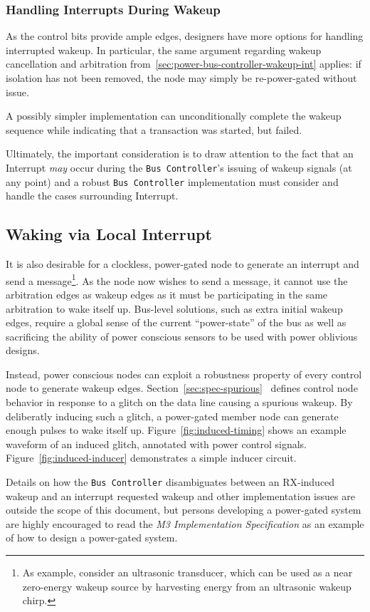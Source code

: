 \subsubsection{Handling Interrupts During Wakeup}
As the control bits provide ample edges, designers have more options for
handling interrupted wakeup. In particular, the same argument regarding wakeup
cancellation and arbitration from~\ref{sec:power-bus-controller-wakeup-int}
applies: if isolation has not been removed, the node may simply be
re-power-gated without issue.

A possibly simpler implementation can unconditionally complete the wakeup
sequence while indicating that a transaction was started, but failed.

Ultimately, the important consideration is to draw attention to the fact that
an Interrupt {\em may} occur during the {\tt Bus~Controller}'s issuing of
wakeup signals (at any point) and a robust {\tt Bus~Controller} implementation
must consider and handle the cases surrounding Interrupt.

\subsection{Waking via Local Interrupt}
It is also desirable for a clockless, power-gated \bus node to generate an
interrupt and send a message\footnote{
  As example, consider an ultrasonic transducer, which can be used as a near
  zero-energy wakeup source by harvesting energy from an ultrasonic wakeup
  chirp.}.
As the node now wishes to send a message, it cannot use the arbitration edges
as wakeup edges as it must be participating in the same arbitration to wake
itself up. Bus-level solutions, such as extra initial wakeup edges, require a
global sense of the current ``power-state'' of the bus as well as sacrificing
the ability of power conscious sensors to be used with power oblivious
designs.

Instead, power conscious nodes can exploit a robustness property of every \bus
control node to generate wakeup edges.
Section~\ref{sec:spec-spurious}~ defines control
node behavior in response to a glitch on the data line causing a spurious
wakeup. By deliberatly inducing such a glitch, a power-gated member node can
generate enough pulses to wake itself up. Figure~\ref{fig:induced-timing}
shows an example waveform of an induced glitch, annotated with power control
signals. Figure~\ref{fig:induced-inducer} demonstrates a simple inducer
circuit.

Details on how the {\tt Bus~Controller} disambiguates between an RX-induced
wakeup and an interrupt requested wakeup and other implementation issues are
outside the scope of this document, but persons developing a power-gated
system are highly encouraged to read the {\em \bus M3 Implementation
Specification} as an example of how to design a power-gated system.

\begin{figure}
  \figTimingInducedGlitch
\end{figure}
